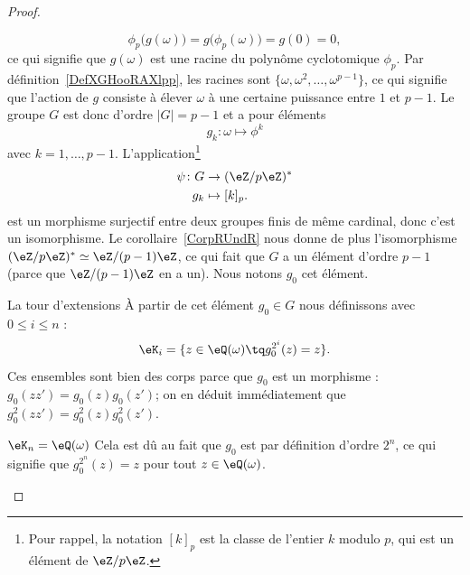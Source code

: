\begin{proof}
\begin{subproof}
\begin{subproof}
                    \begin{equation}
                        \phi_p\big( g(\omega) \big)=g\big( \phi_p(\omega) \big)=g(0)=0,
                    \end{equation}
                    ce qui signifie que \( g(\omega)\) est une racine du polynôme cyclotomique \( \phi_p\). Par définition~\ref{DefXGHooRAXlpp}, les racines sont \( \{ \omega,\omega^2,\ldots, \omega^{p-1} \}\), ce qui signifie que l'action de \( g\) consiste à élever \( \omega\) à une certaine puissance entre \( 1\) et \( p-1\). Le groupe \( G\) est donc d'ordre \( | G |=p-1\) et a pour éléments
                    \begin{equation}
                        g_k\colon \omega\mapsto \phi^k
                    \end{equation}
                    avec \( k=1,\ldots, p-1\). L'application\footnote{Pour rappel, la notation \( [k]_p\) est la classe de l'entier \( k\) modulo \( p\), qui est un élément de \( \eZ/p\eZ\).}
                    \begin{equation}
                        \begin{aligned}
                            \psi\colon G&\to (\eZ/p\eZ)^* \\
                            g_k&\mapsto [k]_p .
                        \end{aligned}
                    \end{equation}
                    est un morphisme surjectif entre deux groupes finis de même cardinal, donc c'est un isomorphisme. Le corollaire~\ref{CorpRUndR} nous donne de plus l'isomorphisme \( (\eZ/p\eZ)^*\simeq \eZ/(p-1)\eZ\), ce qui fait que \( G\) a un élément d'ordre \( p-1\) (parce que \( \eZ/(p-1)\eZ\) en a un). Nous notons \( g_0\) cet élément.
                \item[La tour d'extensions]
                    À partir de cet élément \( g_0\in G\) nous définissons avec \( 0\leq i\leq n\) :
                    \begin{equation}
                        \eK_i=\{ z\in \eQ(\omega)\tq g_0^{2^i}(z)=z \}.
                    \end{equation}
                    Ces ensembles sont bien des corps parce que \( g_0\) est un morphisme : \( g_0(zz')=g_0(z)g_0(z')\); on en déduit immédiatement que \( g_0^2(zz')=g_0^2(z)g_0^2(z')\).
                \item[\( \eK_n=\eQ(\omega)\)]
                    Cela est dû au fait que \( g_0\) est par définition d'ordre \( 2^n\), ce qui signifie que \( g_0^{2^n}(z)=z\) pour tout \( z\in \eQ(\omega)\).

\end{subproof}
\end{subproof}
\end{proof}
